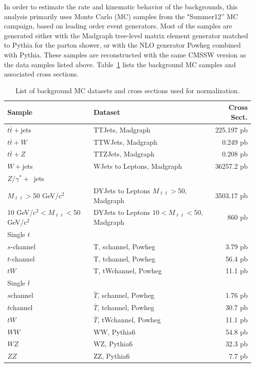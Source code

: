 \par In order to estimate the rate and kinematic behavior of the
backgrounds, this analysis primarily uses Monte Carlo (MC) samples
from the "Summer12'' MC campaign, based on leading order event generators.  Most of the samples are
generated either with the Madgraph tree-level matrix element generator
matched to Pythia for the parton shower, or with the NLO
generator Powheg combined with Pythia.  These samples are
reconstructed with the same CMSSW version as the data samples listed
above.  Table~\ref{tab:bkgSamples} lists the
background MC samples and associated cross sections. 

\begin{table}[hbtp]\footnotesize
\centering
\begin{tabular}{|p{}|p{}|r|}
\hline\hline
Sample & Dataset & Cross Sect. \\
\hline
$t\bar{t}+$jets & TTJets, Madgraph & 225.197 pb \\
\hline
$t\bar{t}+W$ & TTWJets, Madgraph & 0.249 pb \\
\hline
$t\bar{t}+Z$ & TTZJets, Madgraph & 0.208 pb \\
\hline
$W+$jets & WJets to Leptons, Madgraph & 36257.2 pb \\
\hline
$Z/\gamma^* +$~jets & & \\
$M_{\ell\ell} > $50 GeV/c$^2$ & DYJets to Leptons $M_{\ell\ell}>$50, Madgraph & 3503.17 pb \\
10 GeV/c$^2 < M_{\ell\ell} < $50 GeV/c$^2$ & DYJets to Leptons
                                              $10<M_{\ell\ell}<50$, Madgraph & 860 pb \\
\hline
Single $t$ & & \\
$s$-channel & T, s\-channel, Powheg & 3.79 pb\\
$t$-channel & T, t\-channel, Powheg &  56.4 pb \\
$tW$ & T, tW\-channel, Powheg & 11.1 pb \\
\hline
Single $\bar{t}$ & & \\
$s$\-channel & $\bar{T}$, s\-channel, Powheg & 1.76 pb\\
$t$\-channel & $\bar{T}$, t\-channel, Powheg & 30.7 pb \\
$tW$ & $\bar{T}$, tW\-channel, Powheg  & 11.1 pb \\
\hline
$WW$ & WW, Pythia6 & 54.8 pb \\
\hline
$WZ$ & WZ, Pythia6 & 32.3 pb \\
\hline
$ZZ$ & ZZ, Pythia6 & 7.7 pb \\
\hline\hline
\end{tabular}
\caption{List of background MC datasets and cross sections used for normalization.}
\label{tab:bkgSamples}
\end{table}

